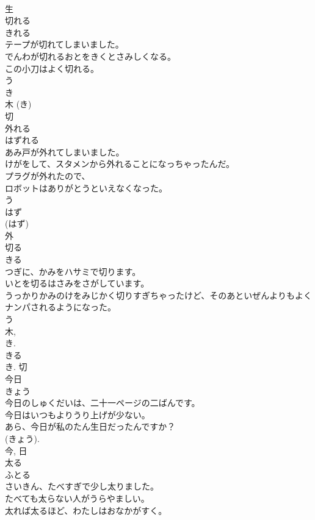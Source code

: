 \documentclass[8pt]{extreport}
\begin{document}
\begin{CJK}{UTF8}{min}
\\	生	
\\	切れる	
\\	きれる	
\\	テープが切れてしまいました。	
\\	でんわが切れるおとをきくとさみしくなる。	
\\	この小刀はよく切れる。	
\\	う 
\\	き 
\\	木 (き) 
\\	切	
\\	外れる	
\\	はずれる	
\\	あみ戸が外れてしまいました。	
\\	けがをして、スタメンから外れることになっちゃったんだ。	
\\	プラグが外れたので、
\\	ロボットはありがとうといえなくなった。	
\\	う 
\\	はず 
\\	(はず) 
\\	外	
\\	切る	
\\	きる	
\\	つぎに、かみをハサミで切ります。	
\\	いとを切るはさみをさがしています。	
\\	うっかりかみのけをみじかく切りすぎちゃったけど、そのあといぜんよりもよくナンパされるようになった。	
\\	う 
\\	木, 
\\	き. 
\\	きる 
\\	き.	切	
\\	今日	
\\	きょう	
\\	今日のしゅくだいは、二十一ページの二ばんです。	
\\	今日はいつもよりうり上げが少ない。	
\\	あら、今日が私のたん生日だったんですか？	
\\	(きょう). 
\\	今, 日	
\\	太る	
\\	ふとる	
\\	さいきん、たべすぎで少し太りました。	
\\	たべても太らない人がうらやましい。	
\\	太れば太るほど、わたしはおなかがすく。	

\end{CJK}
\end{document}
